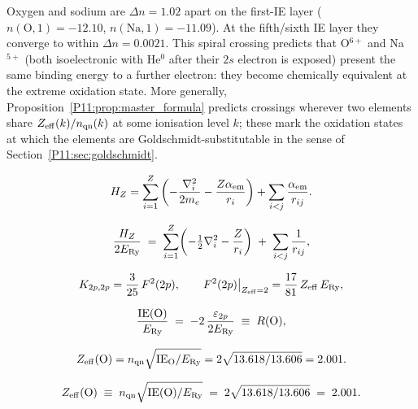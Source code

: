 \begin{remark}
\label{P11:rem:spiral_crossing}
Oxygen and sodium are $\Delta n=1.02$ apart on the first-IE layer
($n(\mathrm{O,1})=-12.10$, $n(\mathrm{Na,1})=-11.09$).
At the fifth/sixth IE layer they converge to within $\Delta n=0.0021$.
This spiral crossing predicts that O$^{6+}$ and Na$^{5+}$
(both isoelectronic with He$^0$ after their $2s$ electron is exposed)
present the same binding energy to a further electron: they become
chemically equivalent at the extreme oxidation state.
More generally, Proposition~\ref{P11:prop:master_formula} predicts
crossings wherever two elements share $Z_{\rm eff}(k)/n_{\rm qn}(k)$
at some ionisation level $k$; these mark the oxidation states at
which the elements are Goldschmidt-substitutable in the sense of
Section~\ref{P11:sec:goldschmidt}.
\end{remark}

\begin{equation}
  H_Z = \sum_{i=1}^Z \left(-\frac{\nabla_i^2}{2m_e} - \frac{Z\alpha_{\mathrm{em}}}{r_i}\right)
       + \sum_{i<j} \frac{\alpha_{\mathrm{em}}}{r_{ij}}.
  \label{P11:eq:HZ}
\end{equation}

\begin{equation}
  \frac{H_Z}{2E_{\mathrm{Ry}}}
  \;=\; \sum_{i=1}^Z
        \!\left(-\tfrac{1}{2}\nabla_i^2 - \frac{Z}{r_i}\right)
  \;+\; \sum_{i<j}\frac{1}{r_{ij}},
  \label{P11:eq:HZ_au}
\end{equation}

\begin{equation}
  K_{2p,2p} = \frac{3}{25}\,F^2(2p),
  \qquad
  F^2(2p)\big|_{Z_\mathrm{eff}=2} = \frac{17}{81}\,Z_\mathrm{eff}\,E_{\mathrm{Ry}},
  \label{P11:eq:K2p2p_angular}
\end{equation}

\begin{equation}
  \frac{\mathrm{IE}(\mathrm{O})}{E_{\mathrm{Ry}}}
  \;=\; -2\,\frac{\varepsilon_{2p}}{2E_{\mathrm{Ry}}}
  \;\equiv\; R(\text{O}),
  \label{P11:eq:R_O}
\end{equation}

\begin{equation}
  Z_\mathrm{eff}(\mathrm{O})
  = n_\mathrm{qn}\sqrt{\mathrm{IE}_\mathrm{O}/E_{\mathrm{Ry}}}
  = 2\sqrt{13.618/13.606}
  = 2.001.
  \label{P11:eq:Zeff_O}
\end{equation}

\begin{equation}
  Z_\mathrm{eff}(\mathrm{O}) \;\equiv\; n_\mathrm{qn}\sqrt{\mathrm{IE}(\mathrm{O})/E_{\mathrm{Ry}}}
  \;=\; 2\sqrt{13.618/13.606} \;=\; 2.001.
  \label{P11:eq:Zeff_def}
\end{equation}

